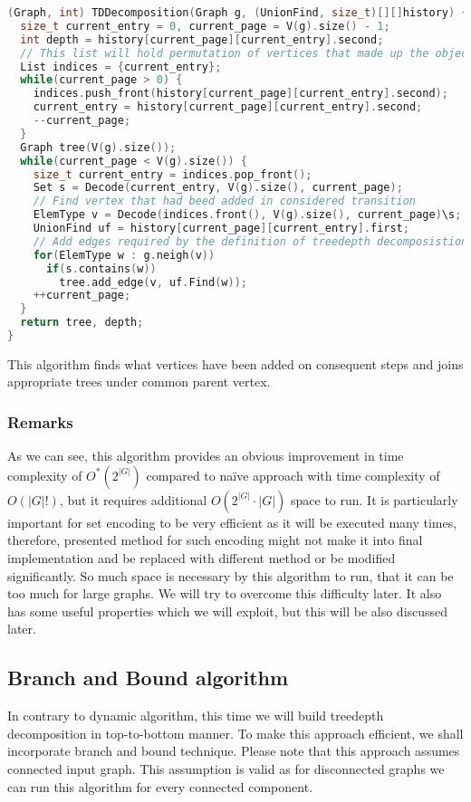 \begin{lstlisting}[language=C++]
(Graph, int) TDDecomposition(Graph g, (UnionFind, size_t)[][]history) {
  size_t current_entry = 0, current_page = V(g).size() - 1;
  int depth = history[current_page][current_entry].second;
  // This list will hold permutation of vertices that made up the object in history[current_page][current_entry]
  List indices = {current_entry};
  while(current_page > 0) {
    indices.push_front(history[current_page][current_entry].second);
    current_entry = history[current_page][current_entry].second;
    --current_page;
  }
  Graph tree(V(g).size());
  while(current_page < V(g).size()) {
    size_t current_entry = indices.pop_front();
    Set s = Decode(current_entry, V(g).size(), current_page);
    // Find vertex that had beed added in considered transition
    ElemType v = Decode(indices.front(), V(g).size(), current_page)\s;
    UnionFind uf = history[current_page][current_entry].first;
    // Add edges required by the definition of treedepth decomposistion
    for(ElemType w : g.neigh(v))
      if(s.contains(w))
        tree.add_edge(v, uf.Find(w));
    ++current_page;
  }
  return tree, depth;
}
\end{lstlisting}
This algorithm finds what vertices have been added on consequent steps and joins appropriate trees under common parent vertex.
\subsubsection{Remarks}
As we can see, this algorithm provides an obvious improvement in time complexity of $O^{*}\left(2^{\left|G\right|}\right)$ compared to na\"ive approach with time complexity of $O\left(\left|G\right|!\right)$, but it requires additional $O\left(2^{\left|G\right|}\cdot\left|G\right|\right)$ space to run. It is particularly important for set encoding to be very efficient as it will be executed many times, therefore, presented method for such encoding might not make it into final implementation and be replaced with different method or be modified significantly. So much space is necessary by this algorithm to run, that it can be too much for large graphs. We will try to overcome this difficulty later. It also has some useful properties which we will exploit, but this will be also discussed later.
\subsection{Branch and Bound algorithm}
In contrary to dynamic algorithm, this time we will build treedepth decomposition in top-to-bottom manner. To make this approach efficient, we shall incorporate branch and bound technique. Please note that this approach assumes connected input graph. This assumption is valid as for disconnected graphs we can run this algorithm for every connected component.
